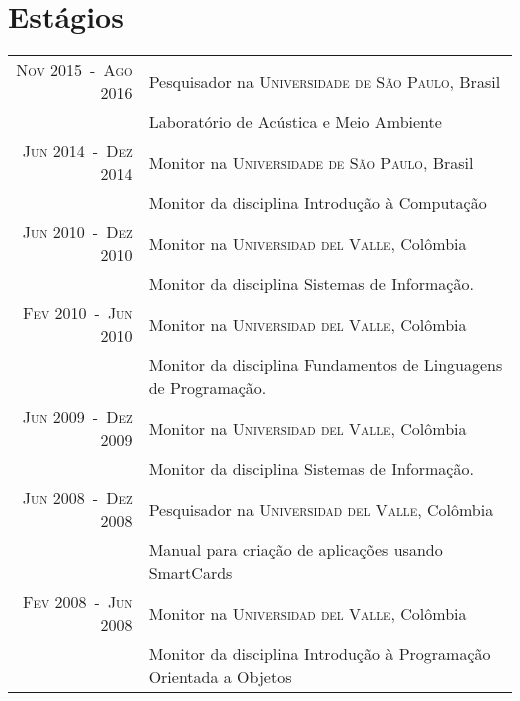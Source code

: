 \documentclass[a4paper,10pt]{article}
\begin{document}
\section{Estágios}
\begin{tabular}{rl}

    \textsc{Nov 2015~-~Ago 2016}  & Pesquisador na \textsc{Universidade de São Paulo}, Brasil \\
                                  &\footnotesize{Laboratório de Acústica e Meio Ambiente} \\

    \textsc{Jun 2014~-~Dez 2014}  & Monitor na \textsc{Universidade de São Paulo}, Brasil \\
                                  &\footnotesize{Monitor da disciplina Introdução à Computação} \\

    \textsc{Jun 2010~-~Dez 2010}  & Monitor na \textsc{Universidad del Valle}, Colômbia \\
                                  &\footnotesize{Monitor da disciplina Sistemas de Informação.} \\

    \textsc{Fev 2010~-~Jun 2010}  & Monitor na \textsc{Universidad del Valle}, Colômbia \\
                                  &\footnotesize{Monitor da disciplina Fundamentos de Linguagens de Programação.} \\

    \textsc{Jun 2009~-~Dez 2009}  & Monitor na \textsc{Universidad del Valle}, Colômbia \\
                                  &\footnotesize{Monitor da disciplina Sistemas de Informação.} \\

    \textsc{Jun 2008~-~Dez 2008}  & Pesquisador na \textsc{Universidad del Valle}, Colômbia \\
                                  &\footnotesize{Manual para criação de aplicações usando SmartCards} \\

    \textsc{Fev 2008~-~Jun 2008}  & Monitor na \textsc{Universidad del Valle}, Colômbia \\
                                  &\footnotesize{Monitor da disciplina Introdução à Programação Orientada a Objetos} \\

\end{tabular}
\end{document}
